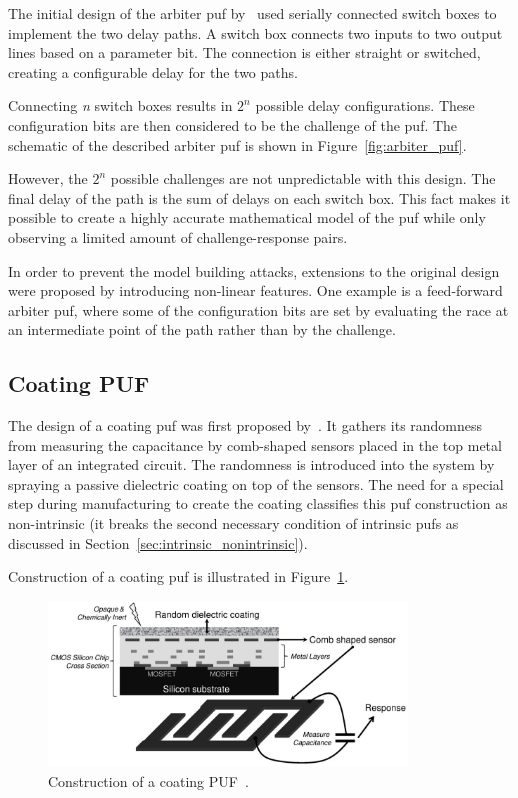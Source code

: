 The initial design of the arbiter \gls{puf} by~\cite{Lee2004} used serially connected switch boxes to implement the two delay paths. A switch box connects two inputs to two output lines based on a parameter bit. The connection is either straight or switched, creating a configurable delay for the two paths.

Connecting \emph{n} switch boxes results in $2^n$ possible delay configurations. These configuration bits are then considered to be the challenge of the \gls{puf}. The schematic of the described arbiter \gls{puf} is shown in Figure~\ref{fig:arbiter_puf}.

However, the $2^n$ possible challenges are not unpredictable with this design. The final delay of the path is the sum of delays on each switch box. This fact makes it possible to create a highly accurate mathematical model of the \gls{puf} while only observing a limited amount of challenge-response pairs.\cite{Lee2004}

In order to prevent the model building attacks, extensions to the original design were proposed by introducing non-linear features. One example is a feed-forward arbiter \gls{puf}, where some of the configuration bits are set by evaluating the race at an intermediate point of the path rather than by the challenge.\cite{Lee2005}

\subsection{Coating PUF}

The design of a coating \gls{puf} was first proposed by~\cite{Tuyls2006}. It gathers its randomness from measuring the capacitance by comb-shaped sensors placed in the top metal layer of an integrated circuit. The randomness is introduced into the system by spraying a passive dielectric coating on top of the sensors. The need for a special step during manufacturing to create the coating classifies this \gls{puf} construction as non-intrinsic (it breaks the second necessary condition of intrinsic \glspl{puf} as discussed in Section~\ref{sec:intrinsic_nonintrinsic}).\cite{Maes2010}

Construction of a coating \gls{puf} is illustrated in Figure~\ref{fig:coating_puf}.

\begin{figure}[h!]
    \centering
    \captionsetup{justification=centering,margin=0.5cm}
    \includegraphics[width=0.85\textwidth]{images/coating_puf.png}
    \caption[Construction of a coating PUF.]{Construction of a coating PUF~\cite{Maes2012}.}
    \label{fig:coating_puf}
\end{figure}

